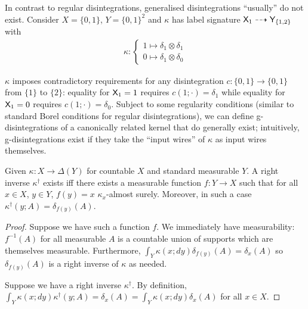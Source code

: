 
In contrast to regular disintegrations, generalised disintegrations ``usually'' do not exist. Consider $X=\{0,1\}$, $Y=\{0,1\}^2$ and $\kappa$ has label signature $\mathsf{X}_1\dashrightarrow \mathsf{Y}_{\{1,2\}}$ with
\begin{align}
	\kappa:\begin{cases} 1\mapsto \delta_1\otimes \delta_1\\
						 0\mapsto \delta_1\otimes \delta_0\end{cases}
\end{align}

$\kappa$ imposes contradictory requirements for any disintegration $c:\{0,1\}\to\{0,1\}$ from $\{1\}$ to $\{2\}$: equality for $\mathsf{X}_1=1$ requires $c(1;\cdot)=\delta_1$ while equality for $\mathsf{X}_1=0$ requires $c(1;\cdot) = \delta_0$. Subject to some regularity conditions (similar to standard Borel conditions for regular disintegrations), we can define g-disintegrations of a canonically related kernel that do generally exist; intuitively, g-disintegrations exist if they take the ``input wires'' of $\kappa$ as input wires themselves.

\begin{lemma}
Given $\kappa:X\to\Delta(Y)$ for countable $X$ and standard measurable $Y$. A right inverse $\kappa^\dagger$ exists iff there exists a measurable function $f:Y\to X$ such that for all $x\in X$, $y\in Y$, $f(y)=x$ $\kappa_x$-almost surely. Moreover, in such a case $\kappa^\dagger(y;A) = \delta_{f(y)}(A)$.
\end{lemma}

\begin{proof}
Suppose we have such a function $f$. We immediately have measurability: $f^{-1}(A)$ for all measurable $A$ is a countable union of supports which are themselves measurable. Furthermore, $\int_Y \kappa(x;dy) \delta_{f(y)}(A) = \delta_x (A)$ so $\delta_{f(y)}(A)$ is a right inverse of $\kappa$ as needed.

Suppose we have a right inverse $\kappa^\dagger$. By definition, $\int_Y \kappa(x;dy)\kappa^\dagger(y;A)=\delta_x(A) = \int_Y \kappa(x;dy) \delta_x(A)$ for all $x\in X$. 
\end{proof}

